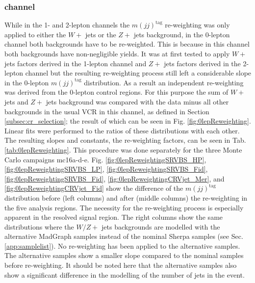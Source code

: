 \subsubsection{\zlep channel}
\label{subsec:mjj_reweight_0lep}
While in the 1- and 2-lepton channels the $m(jj)^\text{tag}$ re-weighting was only applied to either the $W+$ jets or the $Z+$ jets background, in the 0-lepton channel both backgrounds have to be re-weighted. 
This is because in this channel both backgrounds have non-negligible yields.
It was at first tested to apply $W+$ jets factors derived in the 1-lepton channel and $Z+$ jets factors derived in the 2-lepton channel but the resulting re-weighting process still left a considerable slope in the 0-lepton $m(jj)^\text{tag}$ distribution.
As a result an independent re-weighting was derived from the 0-lepton control regions.
For this purpose the sum of $W+$ jets and $Z+$ jets background was compared with the data 
minus all other backgrounds in the usual VCR in this channel, as defined in Section \ref{subsec:cr_selection}; 
the result of which can be seen in Fig. \ref{fig:0lepReweighting}.
Linear fits were performed to the ratios of these distributions with each other.
The resulting slopes and constants, the re-weighting factors, can be seen in Tab. \ref{tab:0lepReweighting}.
This procedure was done separately for the three Monte Carlo campaigns mc16a-d-e.
Fig. \ref{fig:0lepReweightingSRVBS_HP}, \ref{fig:0lepReweightingSRVBS_LP}, \ref{fig:0lepReweightingSRVBS_Fid}, \ref{fig:0lepReweightingSRVBS_Fid}, \ref{fig:0lepReweightingCRVjet_Mer}, and \ref{fig:0lepReweightingCRVjet_Fid} show the difference of the $m(jj)^\text{tag}$ distribution before (left columns) and after (middle columns) the re-weighting in the five analysis regions.
The necessity for the re-weighting process is especially apparent in the resolved signal region.
The right columns show the same distributions where the $W/Z+$ jets backgrounds are modelled with the alternative MadGraph samples instead of the nominal Sherpa samples (see Sec. \ref{app:samplelist}).
No re-weighting has been applied to the alternative samples.
The alternative samples show a smaller slope compared to the nominal samples before re-weighting.
It should be noted here that the alternative samples also show a significant difference in the modelling of the number of jets in the event. 


